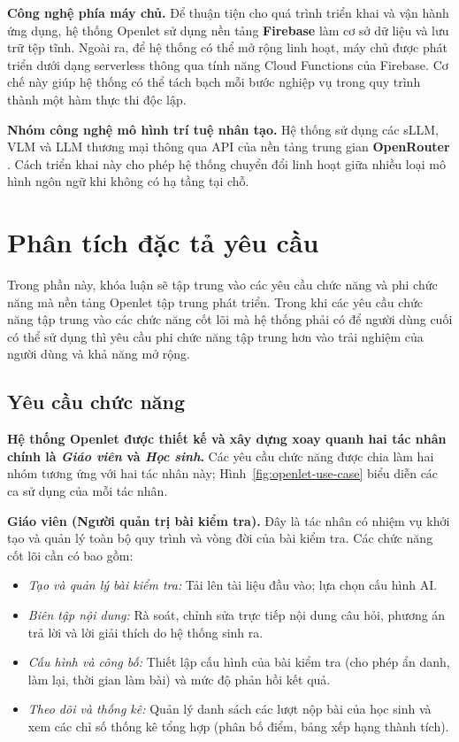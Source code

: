 \textbf{Công nghệ phía máy chủ.} Để thuận tiện cho quá trình triển khai và vận hành ứng dụng, hệ thống Openlet sử dụng nền tảng \textbf{Firebase} \cite{firebase} làm cơ sở dữ liệu và lưu trữ tệp tĩnh. Ngoài ra, để hệ thống có thể mở rộng linh hoạt, máy chủ được phát triển dưới dạng serverless thông qua tính năng Cloud Functions của Firebase. Cơ chế này giúp hệ thống có thể tách bạch mỗi bước nghiệp vụ trong quy trình thành một hàm thực thi độc lập.

\textbf{Nhóm công nghệ mô hình trí tuệ nhân tạo.} Hệ thống sử dụng các sLLM, VLM và LLM thương mại thông qua API của nền tảng trung gian \textbf{OpenRouter} \cite{openrouter}. Cách triển khai này cho phép hệ thống chuyển đổi linh hoạt giữa nhiều loại mô hình ngôn ngữ khi không có hạ tầng tại chỗ.

\section{Phân tích đặc tả yêu cầu}
\label{sec:phan_tich_yeu_cau}
Trong phần này, khóa luận sẽ tập trung vào các yêu cầu chức năng và phi chức năng mà nền tảng Openlet tập trung phát triển. Trong khi các yêu cầu chức năng tập trung vào các chức năng cốt lõi mà hệ thống phải có để người dùng cuối có thể sử dụng thì yêu cầu phi chức năng tập trung hơn vào trải nghiệm của người dùng và khả năng mở rộng.

\subsection{Yêu cầu chức năng}
\textbf{Hệ thống Openlet được thiết kế và xây dựng xoay quanh hai tác nhân chính là \textit{Giáo viên} và \textit{Học sinh}.} Các yêu cầu chức năng được chia làm hai nhóm tương ứng với hai tác nhân này; Hình~\ref{fig:openlet-use-case} biểu diễn các ca sử dụng của mỗi tác nhân.

\textbf{Giáo viên (Người quản trị bài kiểm tra).} Đây là tác nhân có nhiệm vụ khởi tạo và quản lý toàn bộ quy trình và vòng đời của bài kiểm tra. Các chức năng cốt lõi cần có bao gồm:

\begin{itemize}
    \item \textit{Tạo và quản lý bài kiểm tra:} Tải lên tài liệu đầu vào; lựa chọn cấu hình AI.
    \item \textit{Biên tập nội dung:} Rà soát, chỉnh sửa trực tiếp nội dung câu hỏi, phương án trả lời và lời giải thích do hệ thống sinh ra.
    \item \textit{Cấu hình và công bố:} Thiết lập cấu hình của bài kiểm tra (cho phép ẩn danh, làm lại, thời gian làm bài) và mức độ phản hồi kết quả.
    \item \textit{Theo dõi và thống kê:} Quản lý danh sách các lượt nộp bài của học sinh và xem các chỉ số thống kê tổng hợp (phân bố điểm, bảng xếp hạng thành tích).
\end{itemize}

